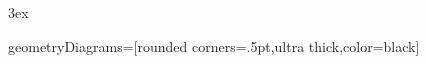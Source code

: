 \makeatletter
\let\c@definition\relax
\let\c@warning\relax
\makeatother
\let\definition\relax
\let\enddefinition\relax

\let\warning\relax
\let\endwarning\relax

		{}                              %
		{}                              %
		{\bfseries}            %
		{}                              %
		{3ex}                           %
		{}%
\theoremstyle{Definition}
\newtheorem{definition}{Definition}
\newtheorem{warning}{Warning}




\newcommand{\snap}{{\bfseries\itshape\textsf{Snap!}}}
\newcommand{\flavor}{\link[\snap]{https://snap.berkeley.edu/}}
\newcommand{\mooculus}{\textsf{\textbf{MOOC}\textnormal{\textsf{ULUS}}}}
\newcommand{\stringstar}[2]{\left\{\frac{#1}{#2}\right\}}
\renewcommand{\l}{\ell}
\renewcommand{\bar}{\overline}


\usepackage{tkz-euclide}
\tikzstyle geometryDiagrams=[rounded corners=.5pt,ultra thick,color=black]



\ifhandout\newcommand{\mynewpage}{\newpage}\else\newcommand{\mynewpage}{}\fi


\usetikzlibrary{cd}




\def\binomialCoefficient#1#2{%
  \the\numexpr 1\expandafter\bKN\expandafter{\the\numexpr #2\relax}{#1}\relax}
\def\bKN#1#2{%
  \ifnum #1<0 *0%
  \else    \ifnum 0<\numexpr 2*#1-(#2)\relax \expandafter\bKN\expandafter{\the\numexpr #2-(#1)\relax}{#2}%
           \else  \bkNK 1{#2}{#1}\fi\fi}
\def\bkNK#1#2#3{%
  \ifnum #1>#3 %
  \else  *(#2)/#1\expandafter\bNkKfi\expandafter{\the\numexpr#2-1\relax}{#1+1}{#3}%
  \fi}      %
\def\bNkKfi#1#2#3#4{%
 #4\expandafter\bkNK\expandafter{\the\numexpr#2\relax}{#1}{#3}}





